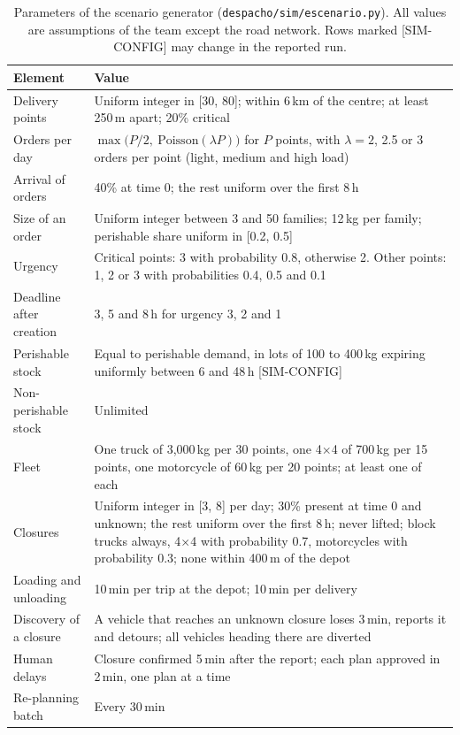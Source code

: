 \documentclass[11pt]{article}
\newcommand{\pend}[1]{\textcolor{red!60!black}{#1}}
\newcommand{\code}[1]{\texttt{\small #1}}
\begin{document}
\begin{table}[ht]
\centering
\small
\caption{Parameters of the scenario generator (\code{despacho/sim/escenario.py}). All values are assumptions of the team except the road network. Rows marked \pend{[SIM-CONFIG]} may change in the reported run.}
\label{tab:simparams}
\begin{tabularx}{\linewidth}{L{4.6cm} Y}
\toprule
Element & Value \\
\midrule
Delivery points & Uniform integer in [30, 80]; within 6\,km of the centre; at least 250\,m apart; 20\% critical \\
Orders per day & $\max\bigl(P/2,\ \mathrm{Poisson}(\lambda P)\bigr)$ for $P$ points, with $\lambda=2$, 2.5 or 3 orders per point (light, medium and high load) \\
Arrival of orders & 40\% at time 0; the rest uniform over the first 8\,h \\
Size of an order & Uniform integer between 3 and 50 families; 12\,kg per family; perishable share uniform in [0.2, 0.5] \\
Urgency & Critical points: 3 with probability 0.8, otherwise 2. Other points: 1, 2 or 3 with probabilities 0.4, 0.5 and 0.1 \\
Deadline after creation & 3, 5 and 8\,h for urgency 3, 2 and 1 \\
Perishable stock & Equal to perishable demand, in lots of 100 to 400\,kg expiring uniformly between 6 and 48\,h \pend{[SIM-CONFIG]} \\
Non-perishable stock & Unlimited \\
Fleet & One truck of 3,000\,kg per 30 points, one 4$\times$4 of 700\,kg per 15 points, one motorcycle of 60\,kg per 20 points; at least one of each \\
Closures & Uniform integer in [3, 8] per day; 30\% present at time 0 and unknown; the rest uniform over the first 8\,h; never lifted; block trucks always, 4$\times$4 with probability 0.7, motorcycles with probability 0.3; none within 400\,m of the depot \\
Loading and unloading & 10\,min per trip at the depot; 10\,min per delivery \\
Discovery of a closure & A vehicle that reaches an unknown closure loses 3\,min, reports it and detours; all vehicles heading there are diverted \\
Human delays & Closure confirmed 5\,min after the report; each plan approved in 2\,min, one plan at a time \\
Re-planning batch & Every 30\,min \\

\end{tabularx}
\end{table}
\end{document}
